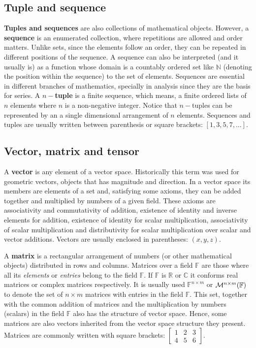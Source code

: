         \subsection*{Tuple and sequence}
\textbf{Tuples and sequences} are also collections of mathematical objects.
However, a \textbf{sequence} is an enumerated collection, where repetitions are allowed and order matters.
Unlike sets, since the elements follow an order, they can be repeated in different positions of the sequence.
A sequence can also be interpreted (and it usually is) as a function whose domain is a countably ordered set like $\mathbb{N}$ 
(denoting the position within the sequence) to the set of elements. 
Sequences are essential in different branches of mathematics, specially in analysis since they are 
the basis for series.
A $n-$\textbf{tuple} is a finite sequence, which means, a finite ordered lists of $n$ elements where $n$ is a non-negative integer.
Notice that $n-$tuples can be represented by an a single dimensional arrangement of $n$ elements.
Sequences and tuples are usually written between parenthesis or square brackets: $[1,3,5,7,...]$.


        \subsection*{Vector, matrix and tensor}
A \textbf{vector} is any element of a vector space.
Historically this term was used for geometric vectors, objects that has magnitude and direction.
In a vector space its members are elements of a set and, satisfying some axioms, they can be added together and multiplied by numbers of a given field. 
These axioms are associativity and commutativity of addition, 
existence of identity and inverse elements for addition, 
existence of identity for scalar multiplication, 
associativity of scalar multiplication and 
distributivity for scalar multiplication over scalar and vector additions. 
Vectors are usually enclosed in parentheses: $(x,y,z)$.

A \textbf{matrix} is a rectangular arrangement of numbers (or other mathematical objects) distributed in rows and columns.
Matrices over a field $\mathbb{F}$ are those where all its \textit{elements} or \textit{entries} belong to the field $\mathbb{F}$.
If $\mathbb{F}$ is $\mathbb{R}$ or $\mathbb{C}$ it conforms real matrices or complex matrices respectively.
It is usually used $\mathbb{F}^{n\times m}$ or ${\cal{M}}^{n \times m} (\mathbb{F})$ to denote 
the set of $n\times m$ matrices with entries in the field $\mathbb{F}$. 
This set, together with the common addition of matrices and the multiplication by numbers (scalars) 
in the field $\mathbb{F}$ also has the structure of vector space. 
Hence, some matrices are also vectors inherited from the vector space structure they present.
Matrices are commonly written with square brackets: $\begin{bmatrix}  1 & 2 & 3 \\  4 & 5 & 6\end{bmatrix}$.


